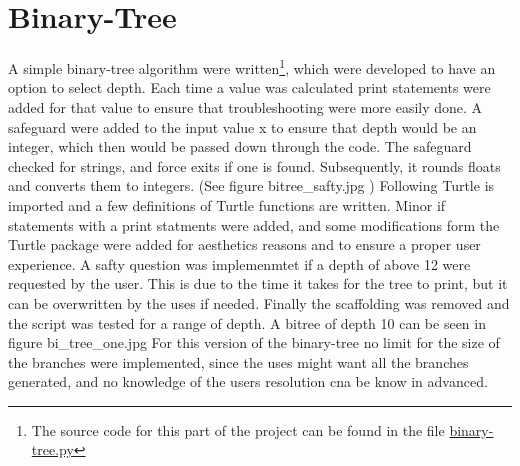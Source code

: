 \documentclass[titlepage]{article}
\begin{document}
\section{Binary-Tree}
A simple binary-tree algorithm were written\footnote{The source code for this part of the project can be found in the file \href{https://github.com/ErikAndersen81/DM550-FractalProject/blob/master/Working_binary_tree.py}{binary-tree.py}}, which were developed to have an option to select depth. Each time a value was calculated print statements were added for that value to ensure that troubleshooting were more easily done.  A safeguard were added to the input value x to ensure that depth would be an integer, which then would be passed down through the code. The safeguard checked for strings, and force exits if one is found. Subsequently, it rounds floats and converts them to integers. (See figure bitree_safty.jpg )
Following Turtle is imported and a few definitions of Turtle functions are written. 
Minor if statements with a print statments were added, and some modifications form the Turtle package were added for aesthetics reasons and to ensure a proper user experience. A safty question was implemenmtet if a depth of above 12 were requested by the user. This is due to the time it takes for the tree to print, but it can be overwritten by the uses if needed.  Finally the scaffolding was removed and the script was tested for a range of depth. A bitree of depth 10 can be seen in figure bi_tree_one.jpg
For this version of the binary-tree no limit for the size of the branches were implemented, since the uses might want all the branches generated, and no knowledge of the users resolution cna be know in advanced. 
\end{document}
